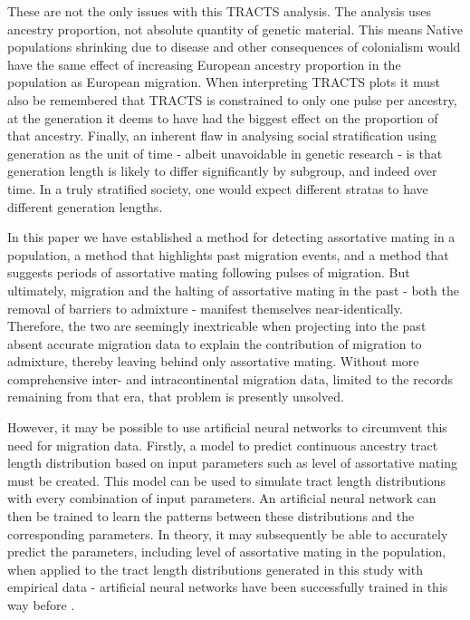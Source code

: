 \documentclass[11pt]{article}
\begin{document}
These are not the only issues with this TRACTS analysis. The analysis uses ancestry proportion, not absolute quantity of genetic material. This means Native populations shrinking due to disease and other consequences of colonialism would have the same effect of increasing European ancestry proportion in the population as European migration. When interpreting TRACTS plots it must also be remembered that TRACTS is constrained to only one pulse per ancestry, at the generation it deems to have had the biggest effect on the proportion of that ancestry. Finally, an inherent flaw in analysing social stratification using generation as the unit of time - albeit unavoidable in genetic research - is that generation length is likely to differ significantly by subgroup, and indeed over time. In a truly stratified society, one would expect different stratas to have different generation lengths. 

In this paper we have established a method for detecting assortative mating in a population, a method that highlights past migration events, and a method that suggests periods of assortative mating following pulses of migration. But ultimately, migration and the halting of assortative mating in the past - both the removal of barriers to admixture - manifest themselves near-identically. Therefore, the two are seemingly inextricable when projecting into the past absent accurate migration data to explain the contribution of migration to admixture, thereby leaving behind only assortative mating. Without more comprehensive inter- and intracontinental migration data, limited to the records remaining from that era, that problem is presently unsolved.

However, it may be possible to use artificial neural networks to circumvent this need for migration data. Firstly, a model to predict continuous ancestry tract length distribution based on input parameters such as level of assortative mating must be created. This model can be used to simulate tract length distributions with every combination of input parameters. An artificial neural network can then be trained to learn the patterns between these distributions and the corresponding parameters. In theory, it may subsequently be able to accurately predict the parameters, including level of assortative mating in the population, when applied to the tract length distributions generated in this study with empirical data - artificial neural networks have been successfully trained in this way before \parencite{Sheehan2016}. 
\end{document}

